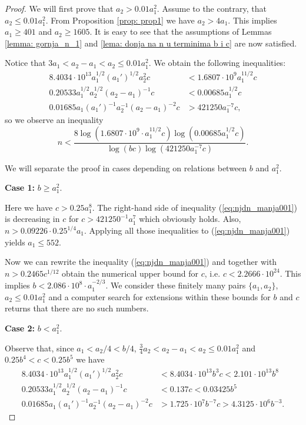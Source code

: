 \documentclass[10pt,a4paper]{amsart}
\begin{document}
\begin{proof}    
We will first prove that $a_2>0.01a_1^2$. 
Assume to the contrary, that $a_2\leq 0.01a_1^2$. From Proposition \ref{prop: prop1} we have $a_2>4a_1$. This implies $a_1\geq 401$ and $a_2\geq 1605.$ 
It is easy to see that the assumptions of Lemmas \ref{lemma: gornja_n_1} and \ref{lema: donja na n u terminima b i c} are now satisfied.

 Notice that $3a_1<a_2-a_1<a_2\leq0.01a_1^2$. We obtain the following inequalities: 
    \begin{align*}
 8.4034\cdot 10^{13}a_1^{1/2}(a_1')^{1/2}a_2^2c&<1.6807\cdot 10^9a_1^{11/2}c\\
 0.20533a_1^{1/2}a_2^{1/2}(a_2-a_1)^{-1}c&<0.00685a_1^{1/2}c\\
 0.01685a_1(a_1')^{-1}a_2^{-1}(a_2-a_1)^{-2}c&>421250a_1^{-7}c,
\end{align*}
so we observe an inequality
\begin{equation}\label{eq:njdn_manja001}
    n<\frac{8\log(1.6807\cdot 10^{9}\cdot a_1^{11/2}c)\log(0.00685a_1^{1/2}c)}{\log(bc)\log(421250a_1^{-7}c)}.
\end{equation}

We will separate the proof in cases depending on relations between $b$ and $a_1^2$. 

\textbf{Case 1:} $b \geq a_1^2$. 

Here we have $c>0.25a_1^8$. The right-hand side of inequality (\ref{eq:njdn_manja001}) is decreasing in $c$ for $c>421250^{-1}a_1^7$ which obviously holds. Also, $n>0.09226\cdot 0.25^{1/4}a_1$. Applying all those inequalities to (\ref{eq:njdn_manja001}) yields $a_1\leq 552$. 

Now we can rewrite the inequality (\ref{eq:njdn_manja001}) and together with  $n>0.2465c^{1/12}$ 
obtain the numerical upper bound for  $c$, i.e. $c<2.2666\cdot 10^{24}$. This implies $b<2.086\cdot 10^{8}\cdot a_1^{-2/3}$. We consider these finitely many pairs $\{a_1,a_2\}$, $a_2\leq 0.01a_1^2$ and a computer search for extensions within these bounds for $b$ and $c$ returns that there are no such numbers.

\textbf{Case 2:} $b<a_1^2$. 

Observe that, since $a_1<a_2/4<b/4$, $\frac{3}{4}a_2<a_2-a_1<a_2\leq 0.01a_1^2$ and $0.25b^4<c<0.25b^5$ we have
   \begin{align*}
 8.4034\cdot 10^{13}a_1^{1/2}(a_1')^{1/2}a_2^2c&<8.4034\cdot 10^{13}b^3c<2.101\cdot 10^{13}b^8\\
 0.20533a_1^{1/2}a_2^{1/2}(a_2-a_1)^{-1}c&<0.137c<0.03425b^5\\
 0.01685a_1(a_1')^{-1}a_2^{-1}(a_2-a_1)^{-2}c&>1.725\cdot 10^7b^{-7}c>4.3125\cdot 10^6b^{-3}. 
\end{align*}


\end{proof}
\end{document}
